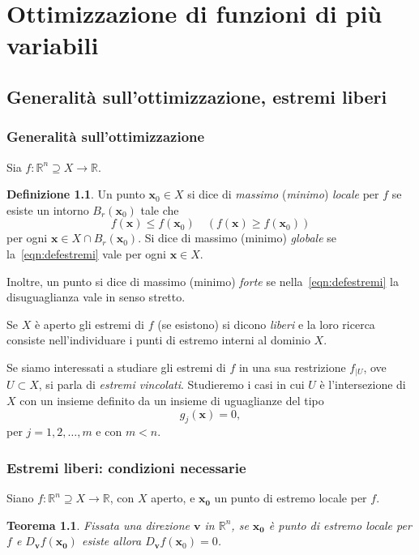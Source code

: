 \documentclass[a4paper]{book}
\numberwithin{equation}{section}
\theoremstyle{plain}
\newtheorem{teor}{Teorema}[section]
\theoremstyle{definition}
\newtheorem{defn}{Definizione}[section]
\theoremstyle{remark}
\renewcommand{\vec}{\boldsymbol}
\theoremstyle{example}
\begin{document}
\chapter{Ottimizzazione di funzioni di più variabili}
\section{Generalità sull'ottimizzazione, estremi liberi}
\subsection{Generalità sull'ottimizzazione}
Sia $f\colon \mathbb{R}^n \supseteq X \to \mathbb{R}$.
\begin{defn}
Un punto $\vec{x}_0 \in X$ si dice di \emph{massimo} (\emph{minimo}) \emph{locale} per $f$ se esiste un intorno $B_r(\vec{x}_0)$ tale che
	\begin{equation}
	\label{eqn:defestremi}
	f(\vec{x}) \le f(\vec{x}_0) 	\quad (f(\vec{x}) \ge f(\vec{x}_0))
	\end{equation}per ogni $\vec{x} \in X \cap B_r(\vec{x}_0)$. Si dice di massimo (minimo) \emph{globale} se la~\eqref{eqn:defestremi} vale per ogni $\vec{x} \in X$.
\end{defn}

Inoltre, un punto si dice di massimo (minimo) \emph{forte} se nella~\eqref{eqn:defestremi} la disuguaglianza vale in senso stretto.

Se $X$ è aperto gli estremi di $f$ (se esistono) si dicono \emph{liberi} e la loro ricerca consiste nell'individuare i punti di estremo interni al dominio $X$.

Se siamo interessati a studiare gli estremi di $f$ in una sua restrizione $f_{|U}$, ove $U \subset X$, si parla di \emph{estremi vincolati}. Studieremo i casi in cui $U$ è l'intersezione di $X$ con un insieme definito da un insieme di uguaglianze del tipo
	\begin{equation*}
	g_j(\vec{x}) = 0,
	\end{equation*}
per $j = 1, 2, \dots, m$ e con $m < n$.

\subsection{Estremi liberi: condizioni necessarie}
Siano $f \colon \mathbb{R}^n \supseteq X \to \mathbb{R}$, con $X$ aperto, e $\vec{x_0}$ un punto di estremo locale per $f$.
\begin{teor}
Fissata una direzione $\vec{v}$ in $\mathbb{R}^n$, se $\vec{x_0}$ è punto di estremo locale per $f$ e $D_{\vec{v}}f(\vec{x_0})$ esiste allora $D_{\vec{v}}f(\vec{x}_0) = 0$.
\end{teor}
\end{document}
